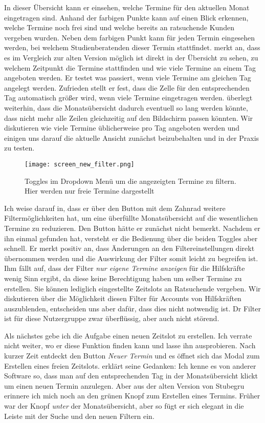 In dieser Übersicht kann er einsehen, welche Termine für den aktuellen Monat
eingetragen sind. Anhand der farbigen Punkte kann \ipName auf einen Blick
erkennen, welche Termine noch frei sind und welche bereits an ratsuchende
Kunden vergeben wurden. Neben dem farbigen Punkt kann für jeden Termin
eingesehen werden, bei welchem Studienberatenden dieser Termin stattfindet.
\ipName merkt an, dass es im Vergleich zur alten Version möglich ist direkt in
der Übersicht zu sehen, zu welchem Zeitpunkt die Termine stattfinden und wie
viele Termine an einem Tag angeboten werden. Er testet was passiert, wenn viele
Termine am gleichen Tag angelegt werden. Zufrieden stellt er fest, dass die
Zelle für den entsprechenden Tag automatisch größer wird, wenn viele Termine
eingetragen werden. \ipName überlegt weiterhin, dass die Monatsübersicht
dadurch eventuell so lang werden könnte, dass nicht mehr alle Zeilen
gleichzeitig auf den Bildschirm passen könnten. Wir diskutieren wie viele
Termine üblicherweise pro Tag angeboten werden und einigen uns darauf die
aktuelle Ansicht zunächst beizubehalten und in der Praxis zu testen.

\begin{figure}[H]
    \caption{Toggles im Dropdown Menü um die angezeigten Termine zu filtern. Hier werden nur freie Termine dargestellt}
    \centering
    \texttt{[image: screen\_new\_filter.png]}
\end{figure}

Ich weise \ipName darauf in, dass er über den Button mit dem Zahnrad weitere
Filtermöglichkeiten hat, um eine überfüllte Monatsübersicht auf die
wesentlichen Termine zu reduzieren. Den Button hätte er zunächst nicht bemerkt.
Nachdem er ihn einmal gefunden hat, versteht er die Bedienung über die beiden
Toggles aber schnell. Er merkt positiv an, dass Änderungen an den
Filtereinstellungen direkt übernommen werden und die Auswirkung der Filter
somit leicht zu begreifen ist. Ihm fällt auf, dass der Filter \textit{nur
    eigene Termine anzeigen} für die Hilfskräfte wenig Sinn ergibt, da diese keine
Berechtigung haben um selber Termine zu erstellen. Sie können lediglich
eingestellte Zeitslots an Ratsuchende vergeben. Wir diskutieren über die
Möglichkeit diesen Filter für Accounts von Hilfskräften auszublenden,
entscheiden uns aber dafür, dass dies nicht notwendig ist. Dr Filter ist für
diese Nutzergruppe zwar überflüssig, aber auch nicht störend.


Als nächstes gebe ich \ipName die Aufgabe einen neuen Zeitslot zu erstellen.
Ich verrate nicht weiter, wo er diese Funktion finden kann und lasse ihn
ausprobieren. Nach kurzer Zeit entdeckt \ipName den Button \textit{Neuer
    Termin} und es öffnet sich das Modal zum Erstellen eines freien Zeitslots.
\ipName erklärt seine Gedanken: \glqq{}Ich kenne es von anderer Software so,
dass man auf den entsprechenden Tag in der Monatsübersicht klickt um einen
neuen Termin anzulegen. Aber aus der alten Version von Stubegru erinnere ich
mich noch an den grünen Knopf zum Erstellen eines Termins. Früher war der Knopf
\textit{unter} der Monatsübersicht, aber so fügt er sich elegant in die Leiste
mit der Suche und den neuen Filtern ein.\grqq{}\cite{clavesUsertest}

